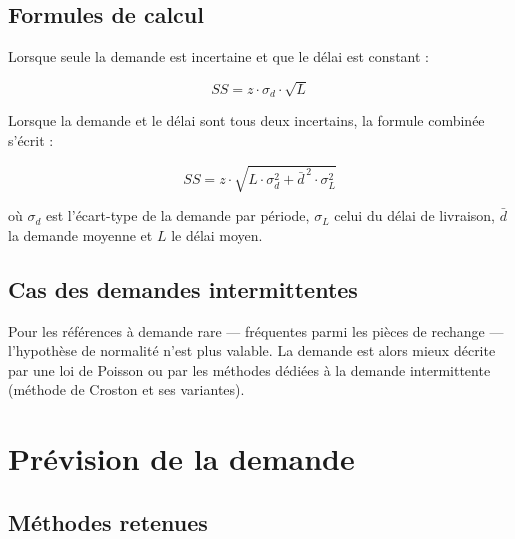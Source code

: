 \subsection{Formules de calcul}

Lorsque seule la demande est incertaine et que le délai est constant :

\begin{equation}
  SS = z \cdot \sigma_{d} \cdot \sqrt{L}
  \label{eq:ss_demande}
\end{equation}

Lorsque la demande et le délai sont tous deux incertains, la formule combinée
s'écrit :

\begin{equation}
  SS = z \cdot \sqrt{ L \cdot \sigma_{d}^{2} + \bar{d}^{\,2} \cdot \sigma_{L}^{2} }
  \label{eq:ss_combine}
\end{equation}

où $\sigma_{d}$ est l'écart-type de la demande par période, $\sigma_{L}$ celui
du délai de livraison, $\bar{d}$ la demande moyenne et $L$ le délai moyen.


\subsection{Cas des demandes intermittentes}

Pour les références à demande rare — fréquentes parmi les pièces de rechange —
l'hypothèse de normalité n'est plus valable. La demande est alors mieux décrite
par une loi de Poisson ou par les méthodes dédiées à la demande intermittente
(méthode de Croston et ses variantes).

\section{Prévision de la demande}
\label{sec:prevision}

\subsection{Méthodes retenues}

